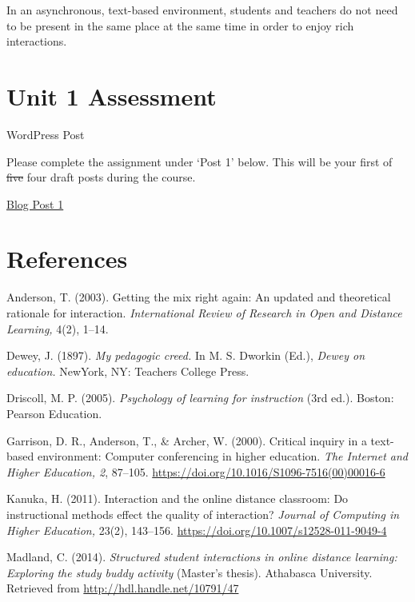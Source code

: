 \documentclass[
]{book}
\begin{document}
In an asynchronous, text-based environment, students and teachers do not need to be present in the same place at the same time in order to enjoy rich interactions.

\hypertarget{unit-1-assessment}{%
\section*{Unit 1 Assessment}\label{unit-1-assessment}}

\begin{wp}
{WordPress Post}

Please complete the assignment under `Post 1' below. This will be your first of \st{five} four draft posts during the course.

\href{https://ma-lead.github.io/ldrs663/assessments.html\#post-1}{Blog Post 1}
\end{wp}

\hypertarget{references}{%
\section*{References}\label{references}}

Anderson, T. (2003). Getting the mix right again: An updated and theoretical rationale for interaction. \emph{International Review of Research in Open and Distance Learning,} 4(2), 1--14.

Dewey, J. (1897). \emph{My pedagogic creed.} In M. S. Dworkin (Ed.), \emph{Dewey on education.} NewYork, NY: Teachers College Press.

Driscoll, M. P. (2005). \emph{Psychology of learning for instruction} (3rd ed.). Boston: Pearson Education.

Garrison, D. R., Anderson, T., \& Archer, W. (2000). Critical inquiry in a text-based environment: Computer conferencing in higher education. \emph{The Internet and Higher Education, 2}, 87--105. \url{https://doi.org/10.1016/S1096-7516(00)00016-6}

Kanuka, H. (2011). Interaction and the online distance classroom: Do instructional methods effect the quality of interaction? \emph{Journal of Computing in Higher Education,} 23(2), 143--156. \url{https://doi.org/10.1007/s12528-011-9049-4}

Madland, C. (2014). \emph{Structured student interactions in online distance learning: Exploring the study buddy activity} (Master's thesis). Athabasca University. Retrieved from \url{http://hdl.handle.net/10791/47}
\end{document}
